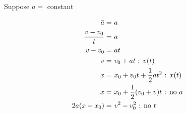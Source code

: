 	Suppose $a = $ constant

	\begin{align}
		\bar{a} = \ &a& \notag \\
		\frac{v - v_{0}}{t} = \ &a& \notag \\
		v - v_{0} = \ &at& \notag \\
		v = \ &v_{0} + at \text{ : }v(t)& \\
		x = \ &x_{0} + v_{0}t + \frac{1}{2} at^{2} \text{ : }x(t)& \\
		x = \ &x_{0} + \frac{1}{2} (v_{0} + v)t \text{ : no }a& \\
		2a(x - x_{0}) = \ &v^{2} - v_{0}^{2} \text{ : no }t&
	\end{align}
